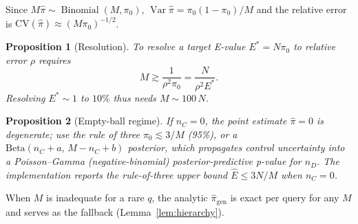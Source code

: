 \documentclass[11pt]{article}
\theoremstyle{oldplain}
\newtheorem{proposition}{Proposition}
\theoremstyle{oldrem}
\DeclareMathOperator{\Binomial}{Binomial}
\DeclareMathOperator{\Var}{Var}
\begin{document}
Since $M\hat\pi\sim\Binomial(M,\pi_0)$, $\Var\hat\pi=\pi_0(1-\pi_0)/M$ and the relative error is
$\mathrm{CV}(\hat\pi)\approx (M\pi_0)^{-1/2}$.
\begin{proposition}[Resolution]\label{prop:resolution}
To resolve a target E-value $E^\ast=N\pi_0$ to relative error $\rho$ requires
\begin{equation}\label{eq:resolution}
  M \gtrsim \frac{1}{\rho^2\pi_0} = \frac{N}{\rho^2 E^\ast}.
\end{equation}
Resolving $E^\ast\sim 1$ to $10\%$ thus needs $M\sim 100\,N$.
\end{proposition}
\begin{proposition}[Empty-ball regime]\label{prop:zero}
If $n_C=0$, the point estimate $\hat\pi=0$ is degenerate; use the rule of three $\pi_0 \lesssim 3/M$
(95\%), or a $\mathrm{Beta}(n_C+a,\,M-n_C+b)$ posterior, which propagates control uncertainty into a
Poisson--Gamma (negative-binomial) posterior-predictive p-value for $n_D$. The implementation reports
the rule-of-three upper bound $\widehat E \le 3N/M$ when $n_C=0$.
\end{proposition}
When $M$ is inadequate for a rare $q$, the analytic $\hat\pi_{\mathrm{gen}}$ is exact per query for
any $M$ and serves as the fallback (Lemma~\ref{lem:hierarchy}).
\end{document}
